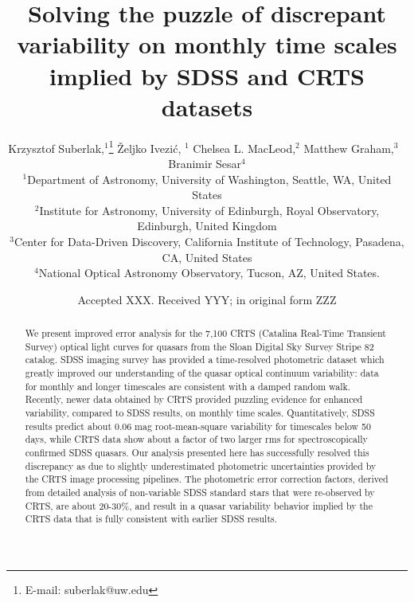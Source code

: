 \documentclass[fleqn,usenatbib]{mnras}  %
\title[Quasar Variability]{Solving the puzzle of discrepant variability on monthly time scales implied by SDSS and CRTS datasets}
\author[K. Suberlak et al.]{
Krzysztof Suberlak,$^{1}$\thanks{E-mail: suberlak@uw.edu}
\v{Z}eljko Ivezi\'c, $^{1}$
Chelsea L. MacLeod,$^{2}$
Matthew Graham,$^{3}$ 
\newauthor
$\, \,  $Branimir Sesar$^{4}$
\\
$^{1}$Department of Astronomy, University of Washington, Seattle, WA, United States\\
$^{2}$Institute for Astronomy, University of Edinburgh, Royal Observatory, Edinburgh, United Kingdom\\
$^{3}$Center for Data-Driven Discovery, California Institute of Technology, Pasadena, CA, United States\\
$^{4}$National Optical Astronomy Observatory, Tucson, AZ, United States.
}
\date{Accepted XXX. Received YYY; in original form ZZZ}
\begin{document}
\label{firstpage}
\pagerange{\pageref{firstpage}--\pageref{lastpage}}
\maketitle

\begin{abstract}

We present improved error analysis for the 7,100 CRTS (Catalina Real-Time Transient Survey) optical  light curves for quasars from the Sloan Digital Sky Survey Stripe 82 catalog. SDSS imaging survey has provided a time-resolved photometric  dataset which greatly improved our understanding of the quasar optical continuum variability: data for monthly and longer timescales  are consistent with a damped random walk. Recently, newer data  obtained by CRTS provided  puzzling evidence for enhanced variability, compared to SDSS results, on monthly time scales. Quantitatively, SDSS results predict  about 0.06 mag root-mean-square variability for timescales below 50 days, while CRTS data show about a factor of two larger rms for spectroscopically confirmed SDSS quasars. Our analysis presented here has successfully resolved this discrepancy as due to slightly underestimated photometric uncertainties provided by the CRTS image processing pipelines. The photometric error correction factors, derived from detailed analysis of non-variable SDSS standard stars that were re-observed by CRTS, are about 20-30\%, and result in a quasar variability behavior implied by the CRTS data that is fully consistent with earlier SDSS results.


\end{abstract}



\end{document}
